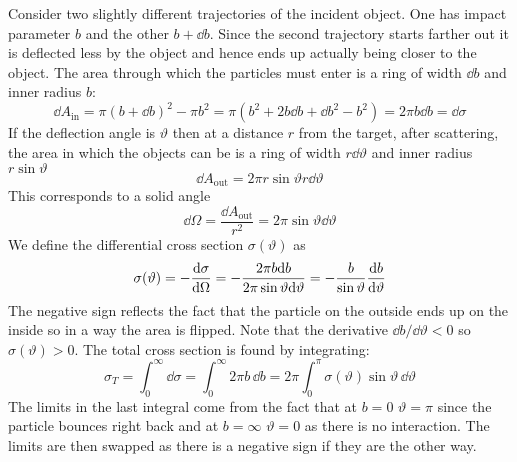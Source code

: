 \documentclass{article}
\begin{document}
    Consider two slightly different trajectories of the incident object.
    One has impact parameter \(b\) and the other \(b + \dd b\).
    Since the second trajectory starts farther out it is deflected less by the object and hence ends up actually being closer to the object.
    The area through which the particles must enter is a ring of width \(\dd b\) and inner radius \(b\):
    \[\dd A_\text{in} = \pi(b + \dd b)^2 - \pi b^2 = \pi(b^2 + 2b\dd b + \dd b^2 - b^2) = 2\pi b\dd b = \dd\sigma\]
    If the deflection angle is \(\vartheta\) then at a distance \(r\) from the target, after scattering, the area in which the objects can be is a ring of width \(r\dd\vartheta\) and inner radius \(r\sin\vartheta\)
    \[\dd A_\text{out} = 2\pi r\sin\vartheta r\dd\vartheta\]
    This corresponds to a solid angle
    \[\dd\Omega = \frac{\dd A_\text{out}}{r^2} = 2\pi\sin\vartheta\dd\vartheta\]
    We define the differential cross section \(\sigma(\vartheta)\) as
    \[\sigma(\vartheta) = -\dv{\sigma}{\Omega} = -\frac{2\pi b\dd b}{2\pi\sin\vartheta\dd\vartheta} = -\frac{b}{\sin\vartheta}\dv{b}{\vartheta}\]
    The negative sign reflects the fact that the particle on the outside ends up on the inside so in a way the area is flipped.
    Note that the derivative \(\dd b/\dd\vartheta < 0\) so \(\sigma(\vartheta) > 0\).
    The total cross section is found by integrating:
    \[\sigma_T = \int_0^{\infty}\dd\sigma = \int_0^\infty 2\pi b\,\dd b = 2\pi\int_0^\pi\sigma(\vartheta)\sin\vartheta\,\dd\vartheta\]
    The limits in the last integral come from the fact that at \(b = 0\) \(\vartheta = \pi\) since the particle bounces right back and at \(b = \infty\) \(\vartheta = 0\) as there is no interaction.
    The limits are then swapped as there is a negative sign if they are the other way.
    
\end{document}
